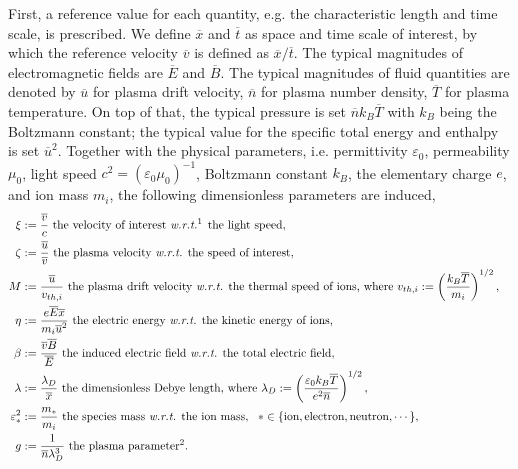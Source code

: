 \documentclass{article}
\begin{document}
First, a reference value for each quantity, e.g. the characteristic length and time scale, is prescribed. We define $\overline{x}$ and $\overline{t}$ as space and time scale of interest, by which the reference velocity $\overline{v}$ is defined as $\overline{x}/\overline{t}$. The typical magnitudes of electromagnetic fields are $\overline{E}$ and $\overline{B}$. The typical magnitudes of fluid quantities are denoted by $\overline{u}$ for plasma drift velocity, $\overline{n}$ for plasma number density, $\overline{T}$ for plasma temperature. On top of that, the typical pressure is set $\overline{n}k_B\overline{T}$ with $k_B$ being the Boltzmann constant; the typical value for the specific total energy and enthalpy is set $\overline{u}^2$. Together with the physical parameters, i.e. permittivity $\varepsilon_0$, permeability $\mu_0$, light speed $c^2 = (\varepsilon_0\mu_0)^{-1}$, Boltzmann constant $k_B$, the elementary charge $e$, and ion mass $m_i$, the following dimensionless parameters are induced,
\begin{align*} 
    \xi &:= \frac{\overline{v}}{c} \text{ the velocity of interest \emph{w.r.t.}\footnotemark[1] the light speed}, &\\
    \zeta &:= \frac{\overline{u}}{\overline{v}} \text{ the plasma velocity \emph{w.r.t.} the speed of interest}, &\\
    M &:= \frac{\overline{u}}{v_{th,i}} \text{ the plasma drift velocity \emph{w.r.t.} the thermal speed of ions, where } v_{th,i} := \left(\frac{k_B \overline{T}}{m_i}\right)^{1/2}, &\\
    \eta &:= \frac{e\overline{E}\overline{x}}{m_i\overline{u}^2} \text{ the electric energy \emph{w.r.t.} the kinetic energy of ions}, &\\
    \beta &:= \frac{\overline{v}\overline{B}}{\overline{E}} \text{ the induced electric field \emph{w.r.t.} the total electric field}, &\\
    \lambda &:= \frac{\lambda_D}{\overline{x}} \text{ the dimensionless Debye length, where }\lambda_D := \left(\frac{\varepsilon_0k_B\overline{T}}{e^2\overline{n}}\right)^{1/2}, &\\
    \varepsilon_*^2 &:= \frac{m_*}{m_i} \text{ the species mass \emph{w.r.t.} the ion mass},\ \  * \in \{\text{ion},\text{electron},\text{neutron},\cdots\}, &\\
    g &:= \frac{1}{\overline{n}\lambda_D^3} \text{ the plasma parameter\footnotemark[2]}.&
\end{align*}
\end{document}
